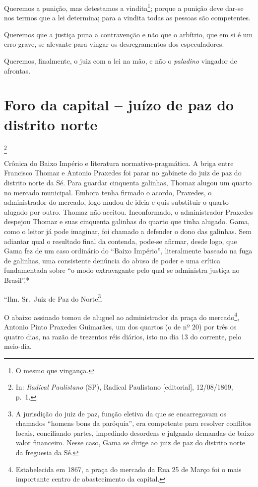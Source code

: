 Queremos a punição, mas detestamos a vindita\footnote{O mesmo que
  vingança.}; porque a punição deve dar-se nos termos que a lei
determina; para a vindita todas as pessoas são competentes.

Queremos que a justiça puna a contravenção e não que o arbítrio, que em
si é um erro grave, se alevante para vingar os desregramentos dos
especuladores.

Queremos, finalmente, o juiz com a lei na mão, e não o \emph{paladino}
vingador de afrontas.

\chapter{Foro da capital -- juízo de paz do distrito norte}\footnote{In:
  \emph{Radical Paulistano} (SP), Radical Paulistano {[}editorial{]},
  12/08/1869, p.~1.}

\begin{didascalia}
Crônica do Baixo Império e literatura normativo-pragmática. A briga
entre Francisco Thomaz e Antonio Praxedes foi parar no gabinete do juiz
de paz do distrito norte da Sé. Para guardar cinquenta galinhas, Thomaz
alugou um quarto no mercado municipal. Embora tenha firmado o acordo,
Praxedes, o administrador do mercado, logo mudou de ideia e quis
substituir o quarto alugado por outro. Thomaz não aceitou. Inconformado,
o administrador Praxedes despejou Thomaz e suas cinquenta galinhas do
quarto que tinha alugado. Gama, como o leitor já pode imaginar, foi
chamado a defender o dono das galinhas. Sem adiantar qual o resultado
final da contenda, pode-se afirmar, desde logo, que Gama fez de um caso
ordinário do ``Baixo Império'', literalmente baseado na fuga de galinhas,
uma consistente denúncia do abuso de poder e uma crítica fundamentada
sobre ``o modo extravagante pelo qual se administra justiça no Brasil''.*
\end{didascalia}

\asterisc{}

``Ilm. Sr.~Juiz de Paz do Norte\footnote{A jurisdição do juiz de paz,
  função eletiva da que se encarregavam os chamados ``homens bons da
  paróquia'', era competente para resolver conflitos locais, conciliando
  partes, impedindo desordens e julgando demandas de baixo valor
  financeiro. Nesse caso, Gama se dirige ao juiz de paz do distrito
  norte da freguesia da Sé.}.

O abaixo assinado tomou de aluguel ao administrador da praça do
mercado\footnote{Estabelecida em 1867, a praça do mercado da Rua 25 de
  Março foi o mais importante centro de abastecimento da capital.},
Antonio Pinto Praxedes Guimarães, um dos quartos (o de nº 20) por três
os quatro dias, na razão de trezentos réis diários, isto no dia 13 do
corrente, pelo meio-dia.

